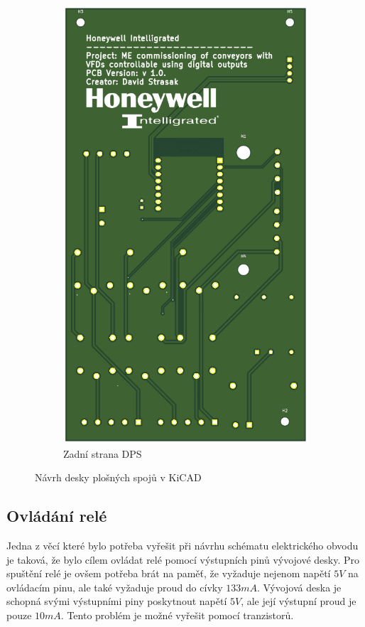 \begin{figure}[hptb]
\begin{subfigure}[t]{0.48\textwidth}
		\includegraphics[width=\textwidth]{images/PCBback.png}
		\caption{Zadní strana DPS}
		\label{fig:PCBback}
	\end{subfigure}
	\caption{Návrh desky plošných spojů v KiCAD}
	\label{fig:PCBbothSides}
\end{figure}

\subsection{Ovládání relé}
Jedna z věcí které bylo potřeba vyřešit při návrhu schématu elektrického obvodu je taková, že bylo cílem ovládat relé pomocí výstupních pinů vývojové desky. Pro spuštění relé je ovšem potřeba brát na paměť, že vyžaduje nejenom napětí $5V$ na ovládacím pinu, ale také vyžaduje proud do cívky $133mA$. Vývojová deska je schopná svými výstupními piny poskytnout napětí $5V$, ale její výstupní proud je pouze $10mA$. Tento problém je možné vyřešit pomocí tranzistorů.

